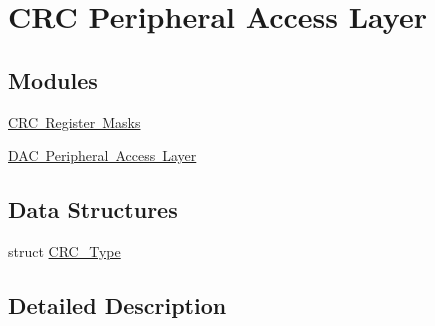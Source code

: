 \hypertarget{group___c_r_c___peripheral___access___layer}{}\section{C\+RC Peripheral Access Layer}
\label{group___c_r_c___peripheral___access___layer}
\subsection*{Modules}
\begin{DoxyCompactItemize}
\item 
\mbox{\hyperlink{group___c_r_c___register___masks}{C\+R\+C Register Masks}}
\item 
\mbox{\hyperlink{group___d_a_c___peripheral___access___layer}{D\+A\+C Peripheral Access Layer}}
\end{DoxyCompactItemize}
\subsection*{Data Structures}
\begin{DoxyCompactItemize}
\item 
struct \mbox{\hyperlink{struct_c_r_c___type}{C\+R\+C\+\_\+\+Type}}
\end{DoxyCompactItemize}


\subsection{Detailed Description}
